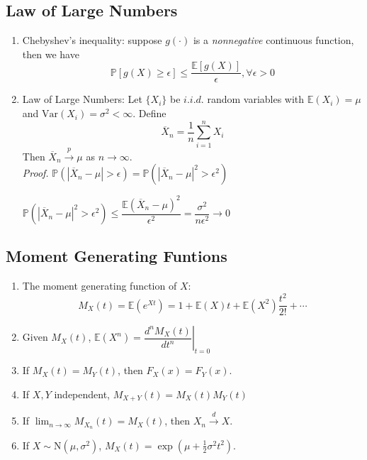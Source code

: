 \documentclass[%
 aip,
 jmp,%
 amsmath,amssymb,
 reprint,%
]{revtex4-1}
\newenvironment{note}{\color{gray}\footnotesize}{}
\def\P{\mathbb{P}}
\def\E{\mathbb{E}}
\def\Var{\mathrm{Var}}
\def\normal{\mathrm{N}}
\begin{document}
\subsection{Law of Large Numbers}
\begin{enumerate}
  \item Chebyshev's inequality: suppose $g(\cdot)$ is a \emph{nonnegative}
        continuous function, then we have
        $$ \P[g(X) \ge \epsilon] \le \frac{\E[g(X)]}{\epsilon}, \forall\epsilon>0 $$

  \item Law of Large Numbers: Let $\{X_i\}$ be $i.i.d.$ random variables with
  $\E(X_i) = \mu$ and $\Var(X_i) = \sigma^2 <\infty$.
  Define $$\overline{X}_n = \frac{1}{n}\sum_{i=1}^{n}X_i$$
  Then $\overline{X}_n \overset{p}{\to} \mu$ as $n\to\infty$.\\

    \begin{note}
      \emph{Proof. } $\P(|\overline{X}_n - \mu| > \epsilon) = \P(|\overline{X}_n - \mu|^2 > \epsilon^2)$

      $\P(|\overline{X}_n - \mu|^2 > \epsilon^2) \leq \dfrac{\E(\overline{X}_n - \mu)^2}{\epsilon^2}
       = \dfrac{\sigma^2}{n\epsilon^2} \to 0 $
    \end{note}

\end{enumerate}


\subsection{Moment Generating Funtions}
\begin{enumerate}
  \item The moment generating function of $X$:
  $$ M_X(t) = \E(e^{Xt}) = 1 + \E(X)t + \E(X^2)\frac{t^2}{2!}+\cdots $$
  \item Given $M_X(t)$, $\E(X^n) = \left.\dfrac{d^n M_X(t)}{dt^n}\right\rvert_{t=0}$
  \item If $M_X(t)=M_Y(t)$, then $F_X(x) = F_Y(x)$.
  \item If $X,Y$ independent, $M_{X+Y}(t) = M_X(t) M_Y(t)$
  \item If $\lim_{n\to\infty} M_{X_n}(t) = M_X(t)$, then $X_n \overset{d}{\to} X$.
  \item If $X \sim \normal(\mu, \sigma^2)$, $M_X(t)=\exp\left(\mu+\frac{1}{2}\sigma^2t^2\right)$.
\end{enumerate}
\end{document}
